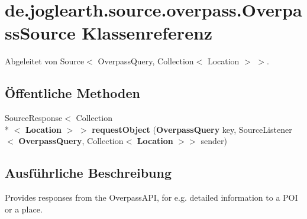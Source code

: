 \section{de.\-joglearth.\-source.\-overpass.\-Overpass\-Source Klassenreferenz}
\label{classde_1_1joglearth_1_1source_1_1overpass_1_1_overpass_source}


Abgeleitet von Source$<$ Overpass\-Query, Collection$<$ Location $>$ $>$.

\subsection*{Öffentliche Methoden}
\begin{DoxyCompactItemize}
\item 
Source\-Response$<$ Collection\\*
$<$ {\bf Location} $>$ $>$ {\bfseries request\-Object} ({\bf Overpass\-Query} key, Source\-Listener$<$ {\bf Overpass\-Query}, Collection$<$ {\bf Location} $>$$>$ sender)\label{classde_1_1joglearth_1_1source_1_1overpass_1_1_overpass_source_aafcb678176107ca731b10b4c2198897b}

\end{DoxyCompactItemize}


\subsection{Ausführliche Beschreibung}
Provides responses from the Overpass\-A\-P\-I, for e.\-g. detailed information to a P\-O\-I or a place. 
